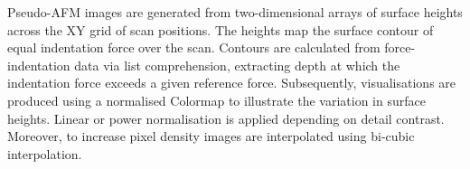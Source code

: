 Pseudo-AFM images are generated from two-dimensional arrays of surface heights across the XY grid of scan positions. The heights map the surface contour of equal indentation force over the scan. Contours are calculated from force-indentation data via list comprehension, extracting depth at which the indentation force exceeds a given reference force. Subsequently, visualisations are produced using a normalised Colormap to illustrate the variation in surface heights. Linear or power normalisation is applied depending on detail contrast. Moreover, to increase pixel density images are interpolated using bi-cubic interpolation.

